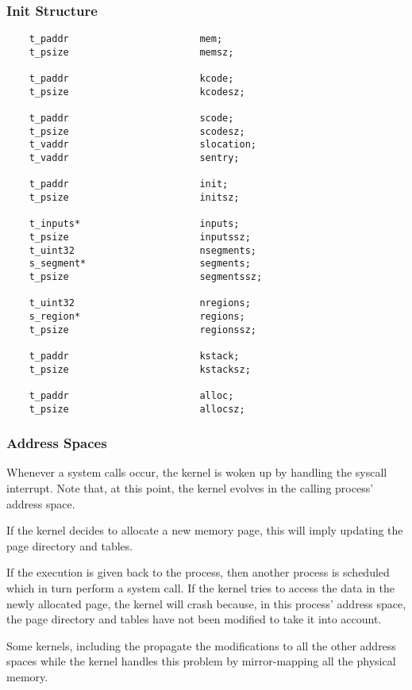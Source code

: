 
\begin{frame}[containsverbatim]
  \frametitle{Init Structure}

  \begin{verbatim}
    t_paddr                       mem;
    t_psize                       memsz;

    t_paddr                       kcode;
    t_psize                       kcodesz;

    t_paddr                       scode;
    t_psize                       scodesz;
    t_vaddr                       slocation;
    t_vaddr                       sentry;

    t_paddr                       init;
    t_psize                       initsz;

    t_inputs*                     inputs;
    t_psize                       inputssz;
    t_uint32                      nsegments;
    s_segment*                    segments;
    t_psize                       segmentssz;

    t_uint32                      nregions;
    s_region*                     regions;
    t_psize                       regionssz;

    t_paddr                       kstack;
    t_psize                       kstacksz;

    t_paddr                       alloc;
    t_psize                       allocsz;
  \end{verbatim}
\end{frame}


\begin{frame}
  \frametitle{Address Spaces}

  Whenever a system calls occur, the kernel is woken up by handling the
  syscall interrupt. Note that, at this point, the kernel evolves in the
  calling process' address space.

  \-

  If the kernel decides to allocate a new memory page, this will imply
  updating the page directory and tables.

  \-

  If the execution is given back to the process, then another process is
  scheduled which in turn perform a system call. If the kernel tries to
  access the data in the newly allocated page, the kernel will crash
  because, in this process' address space, the page directory and tables have
  not been modified to take it into account.

  \-

  Some kernels, including the  propagate the modifications to
  all the other address spaces while the  kernel handles this
  problem by mirror-mapping all the physical memory.
\end{frame}

